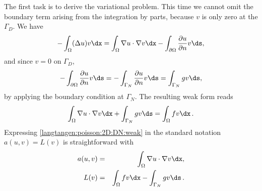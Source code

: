 The first task is to derive the variational problem. This time we cannot
omit the boundary term arising from the integration by parts, because
$v$ is only zero at the $\Gamma_D$. We have
\[
 -\int_\Omega (\Delta u)v \dx
= \int_\Omega\nabla u\cdot\nabla v\dx - \int_{\partial\Omega}{\partial u\over
\partial n}v\ds,
\]
and since $v=0$ on $\Gamma_D$,
\[ 
- \int_{\partial\Omega}{\partial u\over
\partial n}v\ds
=
- \int_{\Gamma_N}{\partial u\over
\partial n}v\ds
= \int_{\Gamma_N}gv\ds,
\]
by applying the boundary condition at $\Gamma_N$.
The resulting weak form reads
\begin{equation}
\int_{\Omega} \nabla u \cdot \nabla v \dx +
\int_{\Gamma_N} gv\ds
= \int_{\Omega} fv \dx\langtangenep
\label{langtangen:poisson:2D:DN:weak}
\end{equation}
Expressing \eqref{langtangen:poisson:2D:DN:weak}
in the standard notation $a(u,v)=L(v)$ is straightforward with
\begin{eqnarray}
a(u, v) &=& \int_{\Omega} \nabla u \cdot \nabla v \dx,
\label{langtangen:poisson2:vard:a}\\
L(v) &=& \int_{\Omega} fv \dx -
\int_{\Gamma_N} gv\ds\langtangenep\label{langtangen:poisson2:vard:L}
\end{eqnarray}

